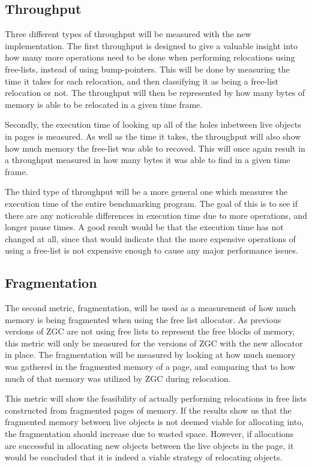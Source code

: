 \subsection{Throughput}
Three different types of throughput will be measured with the new implementation. The first throughput is designed to give a valuable insight into how many more operations need to be done when performing relocations using free-lists, instead of using bump-pointers. This will be done by measuring the time it takes for each relocation, and then classifying it as being a free-list relocation or not. The throughput will then be represented by how many bytes of memory is able to be relocated in a given time frame.

Secondly, the execution time of looking up all of the holes inbetween live objects in pages is measured. As well as the time it takes, the throughput will also show how much memory the free-list was able to recoved. This will once again result in a throughput measured in how many bytes it was able to find in a given time frame.

The third type of throughput will be a more general one which measures the execution time of the entire benchmarking program. The goal of this is to see if there are any noticeable differences in execution time due to more operations, and longer pause times. A good result would be that the execution time has not changed at all, since that would indicate that the more expensive operations of using a free-list is not expensive enough to cause any major performance issues.

\subsection{Fragmentation}
The second metric, fragmentation, will be used as a measurement of how much memory is being fragmented when using the free list allocator. As previous versions of ZGC are not using free lists to represent the free blocks of memory, this metric will only be measured for the versions of ZGC with the new allocator in place. The fragmentation will be measured by looking at how much memory was gathered in the fragmented memory of a page, and comparing that to how much of that memory was utilized by ZGC during relocation.

This metric will show the feasibility of actually performing relocations in free lists constructed from fragmented pages of memory. If the results show us that the fragmented memory between live objects is not deemed viable for allocating into, the fragmentation should increase due to wasted space. However, if allocations are successful in allocating new objects between the live objects in the page, it would be concluded that it is indeed a viable strategy of relocating objects.


